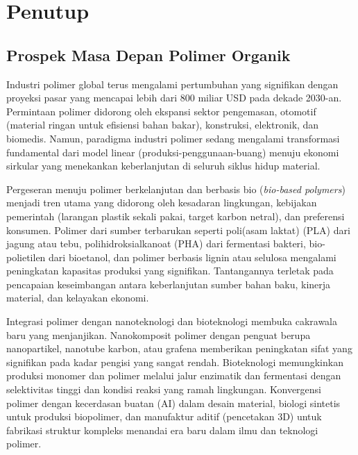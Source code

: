 \documentclass[12pt,a4paper,openany]{book}
\begin{document}

\chapter{Penutup}

\section{Prospek Masa Depan Polimer Organik}

Industri polimer global terus mengalami pertumbuhan yang signifikan dengan proyeksi pasar yang mencapai lebih dari 800 miliar USD pada dekade 2030-an. Permintaan polimer didorong oleh ekspansi sektor pengemasan, otomotif (material ringan untuk efisiensi bahan bakar), konstruksi, elektronik, dan biomedis. Namun, paradigma industri polimer sedang mengalami transformasi fundamental dari model linear (produksi-penggunaan-buang) menuju ekonomi sirkular yang menekankan keberlanjutan di seluruh siklus hidup material.

Pergeseran menuju polimer berkelanjutan dan berbasis bio (\textit{bio-based polymers}) menjadi tren utama yang didorong oleh kesadaran lingkungan, kebijakan pemerintah (larangan plastik sekali pakai, target karbon netral), dan preferensi konsumen. Polimer dari sumber terbarukan seperti poli(asam laktat) (PLA) dari jagung atau tebu, polihidroksialkanoat (PHA) dari fermentasi bakteri, bio-polietilen dari bioetanol, dan polimer berbasis lignin atau selulosa mengalami peningkatan kapasitas produksi yang signifikan. Tantangannya terletak pada pencapaian keseimbangan antara keberlanjutan sumber bahan baku, kinerja material, dan kelayakan ekonomi.

Integrasi polimer dengan nanoteknologi dan bioteknologi membuka cakrawala baru yang menjanjikan. Nanokomposit polimer dengan penguat berupa nanopartikel, nanotube karbon, atau grafena memberikan peningkatan sifat yang signifikan pada kadar pengisi yang sangat rendah. Bioteknologi memungkinkan produksi monomer dan polimer melalui jalur enzimatik dan fermentasi dengan selektivitas tinggi dan kondisi reaksi yang ramah lingkungan. Konvergensi polimer dengan kecerdasan buatan (AI) dalam desain material, biologi sintetis untuk produksi biopolimer, dan manufaktur aditif (pencetakan 3D) untuk fabrikasi struktur kompleks menandai era baru dalam ilmu dan teknologi polimer.
\end{document}
